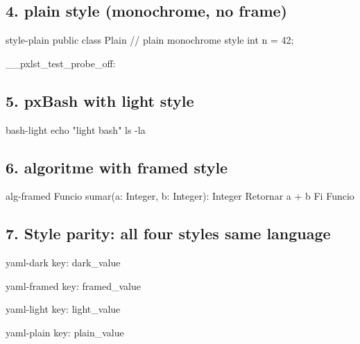 \documentclass{article}
\begin{document}
\subsection*{4. plain style (monochrome, no frame)}
\begin{pxCode}{style-plain}
public class Plain {
    // plain monochrome style
    int n = 42;
}
\end{pxCode}

\makeatletter\ExplSyntaxOn\__pxlst_test_probe_off:\ExplSyntaxOff\makeatother

\subsection*{5. pxBash with light style}
\begin{pxCode}{bash-light}
echo "light bash"
ls -la
\end{pxCode}

\subsection*{6. algoritme with framed style}
\begin{pxCode}{alg-framed}
Funcio sumar(a: Integer, b: Integer): Integer
  Retornar a + b
Fi Funcio
\end{pxCode}

\subsection*{7. Style parity: all four styles same language}
\begin{pxCode}{yaml-dark}
key: dark_value
\end{pxCode}

\begin{pxCode}{yaml-framed}
key: framed_value
\end{pxCode}

\begin{pxCode}{yaml-light}
key: light_value
\end{pxCode}

\begin{pxCode}{yaml-plain}
key: plain_value
\end{pxCode}
\end{document}
